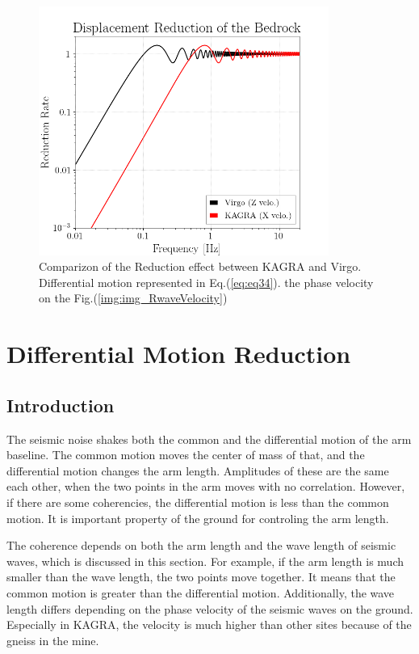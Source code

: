 \documentclass[a4paper,12pt]{book}
\begin{document}
\subsubsection{}


\begin{figure}[H]
  \begin{center}
    \includegraphics[width=9.5cm]{./img_CDMR.png}
  \end{center}
  \caption{Comparizon of the Reduction effect between KAGRA and Virgo. Differential motion represented in Eq.(\ref{eq:eq34}).   the phase velocity on the Fig.(\ref{img:img_RwaveVelocity})}
  \label{img:img_dmrr}
\end{figure}


\section{Differential Motion Reduction}
\subsection{Introduction}
The seismic noise shakes both the common and the differential motion of the arm baseline. The common motion moves the center of mass of that, and the differential motion changes the arm length. Amplitudes of these are the same each other, when the two points in the arm moves with no correlation. However, if there are some coherencies, the differential motion is less than the common motion. It is important property of the ground for controling the arm length.

The coherence depends on both the arm length and the wave length of seismic waves, which is discussed in this section. For example, if the arm length is much smaller than the wave length, the two points move together. It means that the common motion is greater than the differential motion. Additionally, the wave length differs depending on the phase velocity of the seismic waves on the ground. Especially in KAGRA, the velocity is much higher than other sites because of the gneiss in the mine.
\end{document}
